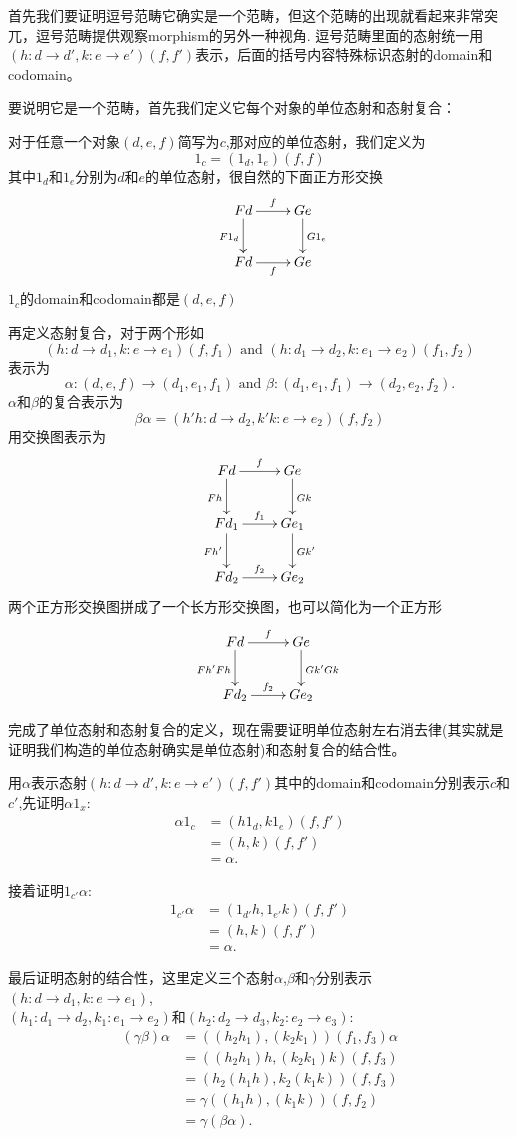 \documentclass{article}
\newcommand{\al}{\alpha}
\newcommand{\be}{\beta}
\newcommand{\gm}{\gamma}
\newcommand{\AND}{\text{ and }}
\newcommand*{\xfunc}[4]{{#2}\colon{#3}{#1}{#4}}
\newcommand*{\func}[3]{\xfunc{\to}{#1}{#2}{#3}}
\newcommand*{\qty}[1]{\left({#1}\right)}
\begin{document}
首先我们要证明逗号范畴它确实是一个范畴，但这个范畴的出现就看起来非常突兀，逗号范畴提供观察morphism的另外一种视角. 逗号范畴里面的态射统一用$\qty{\func{h}{d}{d'},\func{k}{e}{e'}} \qty{f,f'}$表示，后面的括号内容特殊标识态射的domain和codomain。

要说明它是一个范畴，首先我们定义它每个对象的单位态射和态射复合：

对于任意一个对象$\qty{d,e,f}$简写为$c$,那对应的单位态射，我们定义为\[ 1_c  = \qty{1_{d},1_{e}}\qty{f,f}\]其中$1_d$和$1_e$分别为$d$和$e$的单位态射，很自然的下面正方形交换
\[\xymatrix{ &Fd \ar[d]_{F1_{d}} \ar[r]^{f} & Ge\ar[d]^{G1_{e}}
						 \\  & Fd\ar[r]_{f} &Ge   } \]
$1_c$的domain和codomain都是$\qty{d,e,f}$

再定义态射复合，对于两个形如
$$\qty{\func{h}{d}{d_1},\func{k}{e}{e_1}} \qty{f,f_1} \AND
	\qty{\func{h}{d_1}{d_2},\func{k}{e_1}{e_2}} \qty{f_1,f_2}$$ 
表示为
$$\func{\al}{(d,e,f)}{(d_1,e_1,f_1)} \AND
	\func{\be}{(d_1,e_1,f_1)}{(d_2,e_2,f_2)}.$$ $\al$和$\be$的复合表示为
\[\be  \al=\qty{\func{h'  h}{d}{d_{2}},\func{k'  k}{e}{e_{2}}}\qty{f,f_2}\]用交换图表示为\[\xymatrix{ Fd \ar[d]_{Fh} \ar[r]^{f} & Ge\ar[d]^{Gk}  \\
			Fd_{1} \ar[d]_{Fh'}\ar[r]^{f_{1}}& Ge_{1} \ar[d]^{Gk'} \\
	Fd_{2} \ar[r]^{f_{2}} &Ge_2 } \]两个正方形交换图拼成了一个长方形交换图，也可以简化为一个正方形\[\xymatrix{ &Fd \ar[d]_{Fh'  Fh}\ar[r]^{f} & Ge\ar[d]^{Gk' Gk}
			 \\  & Fd_2\ar[r]^{f_2} &Ge_2 }\]
			 
完成了单位态射和态射复合的定义，现在需要证明单位态射左右消去律(其实就是证明我们构造的单位态射确实是单位态射)和态射复合的结合性。

用$\al$表示态射$\qty{\func{h}{d}{d'},\func{k}{e}{e'}} \qty{f,f'}$其中的domain和codomain分别表示$c$和$c'$,先证明$\al 1_x$:
\begin{align*}
	\al  1_{c } &= \qty{h 1_{d},k 1_{e}}\qty{f,f'}\\
	&= \qty{h,k}\qty{f,f'} \\
	 &= \al.
\end{align*}

接着证明$1_{c'}\al$:
\begin{align*}
	1_{c' } \al &= \qty{1_{d'} h, 1_{e'} k}\qty{f,f'}\\
	&= \qty{h,k}\qty{f,f'}\\
	&= \al.
\end{align*}

最后证明态射的结合性，这里定义三个态射$\al$,$\be$和$\gm$分别表示$\qty{\func{h}{d}{d_1},\func{k}{e}{e_1}}$,\\$\qty{\func{h_1}{d_1}{d_2},\func{k_1}{e_1}{e_2}}$和$\qty{\func{h_2}{d_2}{d_3},\func{k_2}{e_2}{e_3}}$:
\begin{align*}
	(\gm\be)\al&=((h_2h_1),(k_2 k_1))(f_1,f_3) \al\\
	&=((h_2 h_1) h,(k_2 k_1) k)(f,f_3)\\
	&=(h_2(h_1 h),k_2(k_1 k))(f,f_3)\\
	&=\gm((h_1 h),(k_1 k))(f,f_2)\\
	&=\gm(\be \al).
\end{align*}
\end{document}
